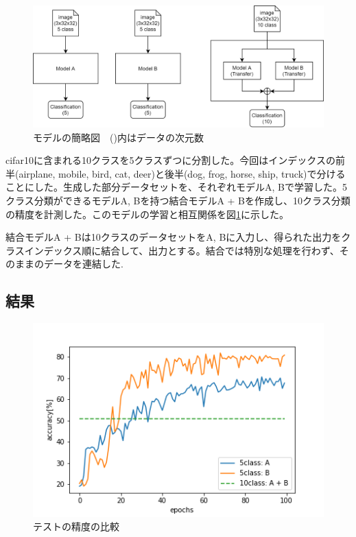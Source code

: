 \documentclass[twocolumn]{jarticle}     %
\begin{document}
\begin{figure}[t]
	\begin{center}
		\includegraphics[clip,width=16cm]{model_figure.png}
		\caption{モデルの簡略図　()内はデータの次元数}
		\label{fig:model}
	\end{center}
\end{figure}

cifar10に含まれる10クラスを5クラスずつに分割した。今回はインデックスの前半(airplane, mobile, bird, cat, deer)と後半(dog, frog, horse, ship, truck)で分けることにした。生成した部分データセットを、それぞれモデルA, Bで学習した。5クラス分類ができるモデルA, Bを持つ結合モデルA + Bを作成し、10クラス分類の精度を計測した。このモデルの学習と相互関係を図\ref{fig:model}に示した。

結合モデルA + Bは10クラスのデータセットをA, Bに入力し、得られた出力をクラスインデックス順に結合して、出力とする。結合では特別な処理を行わず、そのままのデータを連結した.

\subsection{結果}

\begin{figure}[tb]
	\begin{center}
		\includegraphics[clip,width=12cm]{accuracy.png}
		\caption{テストの精度の比較}
		\label{fig:accuracy}
	\end{center}
\end{figure}
\end{document}
